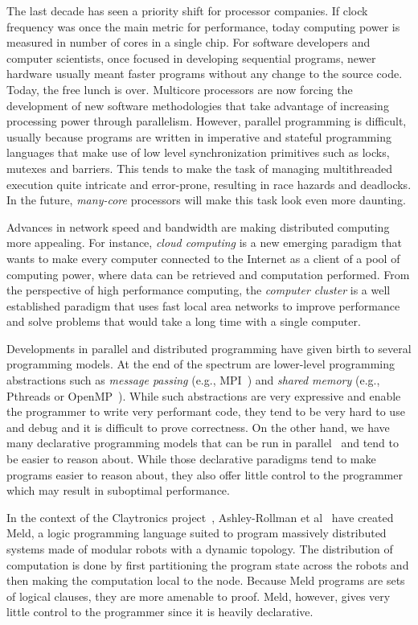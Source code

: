
The last decade has seen a priority shift for processor companies. If clock frequency
was once the main metric for performance, today computing power is measured in number of
cores in a single chip.
For software developers and computer scientists, once focused in developing sequential programs,
newer hardware usually meant faster programs without any change to the source code. Today,
the free lunch is over. Multicore processors are now forcing the development of
new software methodologies that take advantage of increasing processing power through parallelism.
However, parallel programming is difficult, usually because programs are written
in imperative and stateful programming languages that make use of low level synchronization
primitives such as locks, mutexes and barriers. This tends to make the task of managing multithreaded
execution quite intricate and error-prone, resulting in race hazards and deadlocks.
In the future, \emph{many-core} processors will make this task look even more daunting.

Advances in network speed and bandwidth are making distributed computing
more appealing. For instance, \emph{cloud computing} is a new emerging paradigm that wants
to make every computer connected to the Internet as a client of a pool of computing power,
where data can be retrieved and computation performed. From the perspective of high performance
computing, the \emph{computer cluster} is a well established paradigm that uses fast local area
networks to improve performance and solve problems that would take a long time with a single computer.

Developments in parallel and distributed programming have given birth to several programming models.
At the end of the spectrum are lower-level programming abstractions such as
\emph{message passing} (e.g., MPI~\cite{gabriel04-open-mpi}) and \emph{shared memory}
(e.g., Pthreads or OpenMP~\cite{Chapman-2007-UOP-1370966}).
While such abstractions are very expressive and enable the programmer to write very performant code,
they tend to be very hard to use and debug and it is difficult to prove correctness.
On the other hand, we have many declarative programming models
that can be run in parallel~\cite{Blelloch:1996:PPA:227234.227246} and tend to be easier to reason about.
While those declarative paradigms tend to make programs easier to reason about, they also offer little
control to the programmer which may result in suboptimal performance.

In the context of the Claytronics project~\cite{goldstein-computer05}, Ashley-Rollman et al~\cite{ashley-rollman-iclp09, ashley-rollman-derosa-iros07wksp} have created
Meld, a logic programming language suited to program massively distributed systems made of modular robots
with a dynamic topology. The distribution of computation is done by first partitioning the program
state across the robots and then making the computation local to the node. Because Meld programs
are sets of logical clauses, they are more amenable to proof. Meld, however, gives very little control
to the programmer since it is heavily declarative.

